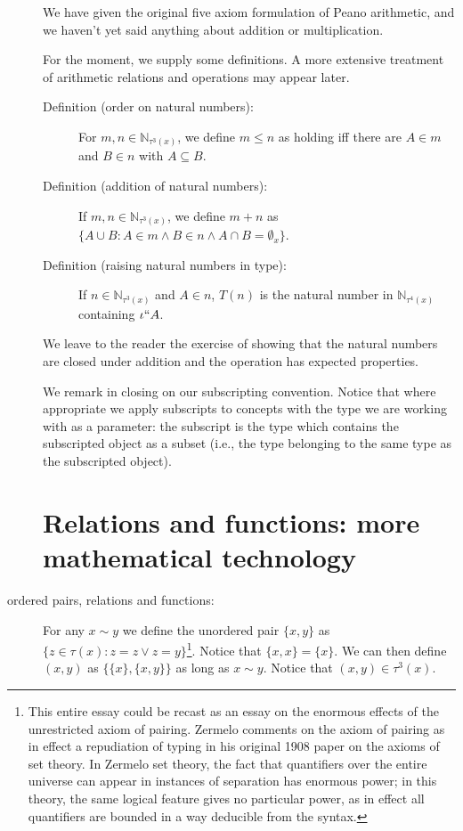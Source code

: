 \documentclass[12pt]{article}
\begin{document}
\begin{description}
We have given the original five axiom formulation of Peano arithmetic, and we haven't yet said anything about addition or multiplication.


For the moment, we supply some definitions.  A more extensive treatment of arithmetic relations and operations may appear later.

\begin{description}

\item[Definition (order on natural numbers):]  For $m,n \in \mathbb N_{\tau^3(x)}$, we define $m \leq n$ as holding iff
there are $A \in m$ and $B \in n$ with $A \subseteq B$.

\item[Definition (addition of natural numbers):]  If $m,n \in \mathbb N_{\tau^3(x)}$, we define $m+n$ as $\{A \cup B:A \in m \wedge B \in n \wedge A \cap B = \emptyset_x\}$.

\item[Definition (raising natural numbers in type):]  If $n \in \mathbb N_{\tau^3(x)}$ and $A \in n$, $T(n)$ is the natural number in $\mathbb N_{\tau^4(x)}$ containing $\iota``A$.

\end{description}

We leave to the reader the exercise of showing that the natural numbers are closed under addition and the operation has expected properties.

We remark in closing on our subscripting convention.  Notice that where appropriate we apply subscripts to concepts
with the type we are working with as a parameter:  the subscript is the type which contains the subscripted object as a subset (i.e., the type belonging to the same type as the subscripted object).



\section{Relations and functions:  more mathematical technology}


\item[ordered pairs, relations and functions:]  For any $x \sim y$ we define the unordered pair $\{x,y\}$ as $\{z \in \tau(x):z=z \vee z=y\}$\footnote{This entire essay could be recast as an essay on the enormous effects of the unrestricted axiom of pairing.  Zermelo comments on the axiom of pairing as in effect a repudiation of typing in his original 1908 paper on the axioms of set theory.  In Zermelo set theory, the fact that quantifiers over the entire universe can appear in instances of separation has enormous power;  in this theory, the same logical feature gives no particular power, as in effect all quantifiers are bounded in a way deducible from the syntax.}.  Notice that $\{x,x\} = \{x\}$.  We can then define $(x,y)$ as
$\{\{x\},\{x,y\}\}$ as long as $x \sim y$.  Notice that $(x,y) \in \tau^3(x)$.


\end{description}
\end{document}
